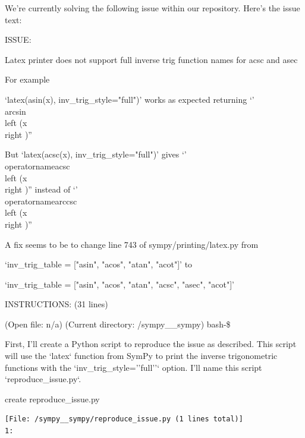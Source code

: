 {
\captionsetup{type=figure}
\begin{issuebox}We're currently solving the following issue within our repository. Here's the issue text:

ISSUE:

Latex printer does not support full inverse trig function names for acsc and asec

For example

`latex(asin(x), inv\_trig\_style="full")' works as expected returning `'\\arcsin{\\left (x \\right )}''

But `latex(acsc(x), inv\_trig\_style="full")' gives `'\\operatorname{acsc}{\\left (x \\right )}'' instead of `'\\operatorname{arccsc}{\\left (x \\right )}''



A fix seems to be to change line 743 of sympy/printing/latex.py from

`inv\_trig\_table = ["asin", "acos", "atan", "acot"]' to

`inv\_trig\_table = ["asin", "acos", "atan", "acsc", "asec", "acot"]'









INSTRUCTIONS: (31 lines)

\begin{CodeVerbatim}[breaklines=true, breakanywhere=true]
(Open file: n/a)
(Current directory: /sympy__sympy)
bash-\$
\end{CodeVerbatim}
\end{issuebox}
\begin{agentbox}
First, I'll create a Python script to reproduce the issue as described. This script will use the `latex` function from SymPy to print the inverse trigonometric functions with the `inv\_trig\_style=''full''` option. I'll name this script `reproduce\_issue.py`.



\hrulefill
\begin{CodeVerbatim}[breaklines=true, breakanywhere=true]
create reproduce_issue.py
\end{CodeVerbatim}
\end{agentbox}
\begin{observationbox}\begin{Verbatim}[breaklines=true, breakanywhere=true]
[File: /sympy__sympy/reproduce_issue.py (1 lines total)]
1:


\end{Verbatim}
\end{observationbox}}
